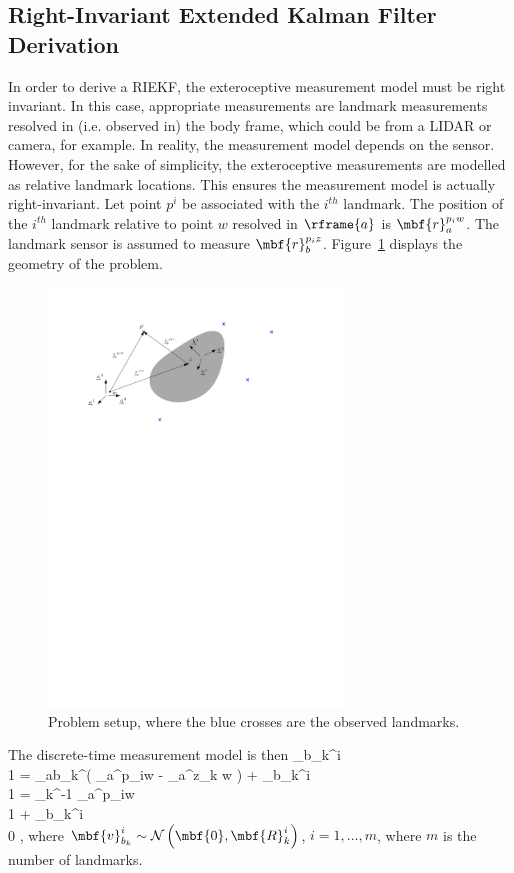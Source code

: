 \subsection{Right-Invariant Extended Kalman Filter Derivation}
\label{ssec:SE3_RIEKF}

In order to derive a RIEKF, the exteroceptive measurement model must be right invariant. In this case, appropriate measurements are landmark measurements resolved in (i.e. observed in) the body frame, which could be from a LIDAR or camera, for example. In reality, the measurement model depends on the sensor. However, for the sake of simplicity, the exteroceptive measurements are modelled as relative landmark locations. This ensures the measurement model is actually right-invariant. Let point $p^i$ be associated with the $i^{th}$ landmark. The position of the $i^{th}$ landmark relative to point $w$ resolved in $\rframe{a}$ is $\mbf{r}_a^{p_iw}$. The landmark sensor is assumed to measure $\mbf{r}_b^{p_iz}$. Figure~\ref{fig:se3_prob_landmarks} displays the geometry of the problem. 
\begin{figure}
	\centering
	\includegraphics[width=0.7\textwidth]{figs/prob_landmarks.pdf}
	\caption{Problem setup, where the blue crosses are the observed landmarks.}
	\label{fig:se3_prob_landmarks}
\end{figure}
The discrete-time measurement model is then
\beq
	 _{b_k}^i \\ 1 \ema =  _{ab_k}^\trans\left( _a^{p_iw} - _a^{z_k w} \right) +  _{b_k}^i \\ 1 \ema = _k^{-1}
		 _a^{p_iw}\\
		1
	\ema
	+ 
		_{b_k}^i \\
		0
	\ema, \label{eq:se3_meas_right}
\eeq
where $\mbf{v}_{b_k}^i \sim \mathcal{N}\left(\mbf{0},\mbf{R}_k^i\right)$, $i = 1,\ldots,m$, where $m$ is the number of landmarks.

